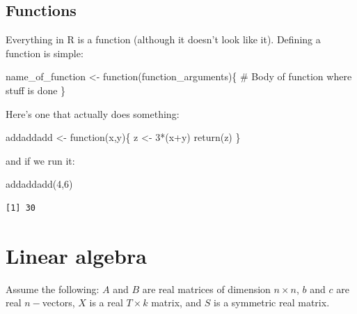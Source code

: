 \documentclass[
  letterpaper,
]{book}
\newenvironment{Shaded}{\begin{snugshade}}{\end{snugshade}}
\newcommand{\CommentTok}[1]{\textcolor[rgb]{0.37,0.37,0.37}{#1}}
\newcommand{\ControlFlowTok}[1]{\textcolor[rgb]{0.00,0.23,0.31}{#1}}
\newcommand{\DecValTok}[1]{\textcolor[rgb]{0.68,0.00,0.00}{#1}}
\newcommand{\FunctionTok}[1]{\textcolor[rgb]{0.28,0.35,0.67}{#1}}
\newcommand{\NormalTok}[1]{\textcolor[rgb]{0.00,0.23,0.31}{#1}}
\newcommand{\OtherTok}[1]{\textcolor[rgb]{0.00,0.23,0.31}{#1}}
\newcommand{\SpecialCharTok}[1]{\textcolor[rgb]{0.37,0.37,0.37}{#1}}
\begin{document}
\hypertarget{functions}{%
\subsection{Functions}\label{functions}}

Everything in R is a function (although it doesn't look like it).
Defining a function is simple:

\begin{Shaded}
\begin{Highlighting}[]
\NormalTok{name\_of\_function }\OtherTok{\textless{}{-}} \ControlFlowTok{function}\NormalTok{(function\_arguments)\{}
  \CommentTok{\# Body of function where stuff is done  }
\NormalTok{\}}
\end{Highlighting}
\end{Shaded}

Here's one that actually does something:

\begin{Shaded}
\begin{Highlighting}[]
\NormalTok{addaddadd }\OtherTok{\textless{}{-}} \ControlFlowTok{function}\NormalTok{(x,y)\{}
\NormalTok{  z }\OtherTok{\textless{}{-}} \DecValTok{3}\SpecialCharTok{*}\NormalTok{(x}\SpecialCharTok{+}\NormalTok{y)}
  \FunctionTok{return}\NormalTok{(z)}
\NormalTok{\}}
\end{Highlighting}
\end{Shaded}

and if we run it:

\begin{Shaded}
\begin{Highlighting}[]
\FunctionTok{addaddadd}\NormalTok{(}\DecValTok{4}\NormalTok{,}\DecValTok{6}\NormalTok{)}
\end{Highlighting}
\end{Shaded}

\begin{verbatim}
[1] 30
\end{verbatim}

\hypertarget{linear-algebra-1}{%
\section{Linear algebra}\label{linear-algebra-1}}

Assume the following: \(A\) and \(B\) are real matrices of dimension
\(n\times n\), \(b\) and \(c\) are real \(n-\)vectors, \(X\) is a real
\(T\times k\) matrix, and \(S\) is a symmetric real matrix.
\end{document}
